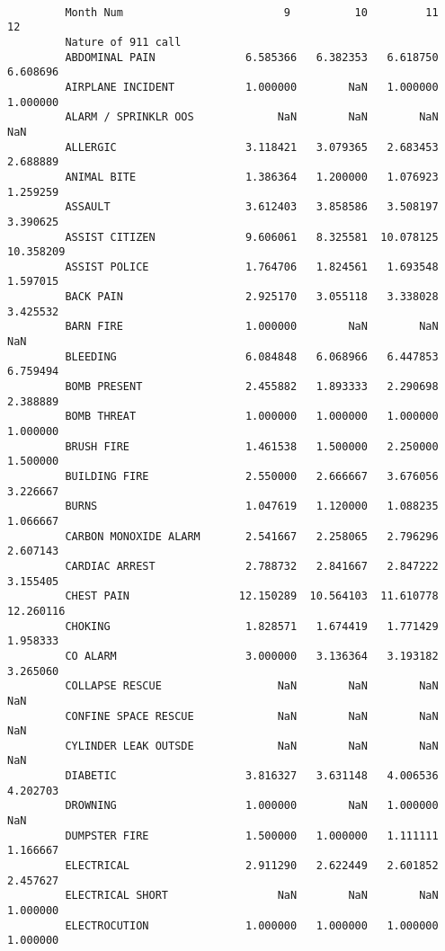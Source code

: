 \documentclass[11pt]{article}
\begin{document}
\begin{Verbatim}[commandchars=\\\{\}]
                                                                                
         Month Num                         9          10         11         12  
         Nature of 911 call                                                     
         ABDOMINAL PAIN              6.585366   6.382353   6.618750   6.608696  
         AIRPLANE INCIDENT           1.000000        NaN   1.000000   1.000000  
         ALARM / SPRINKLR OOS             NaN        NaN        NaN        NaN  
         ALLERGIC                    3.118421   3.079365   2.683453   2.688889  
         ANIMAL BITE                 1.386364   1.200000   1.076923   1.259259  
         ASSAULT                     3.612403   3.858586   3.508197   3.390625  
         ASSIST CITIZEN              9.606061   8.325581  10.078125  10.358209  
         ASSIST POLICE               1.764706   1.824561   1.693548   1.597015  
         BACK PAIN                   2.925170   3.055118   3.338028   3.425532  
         BARN FIRE                   1.000000        NaN        NaN        NaN  
         BLEEDING                    6.084848   6.068966   6.447853   6.759494  
         BOMB PRESENT                2.455882   1.893333   2.290698   2.388889  
         BOMB THREAT                 1.000000   1.000000   1.000000   1.000000  
         BRUSH FIRE                  1.461538   1.500000   2.250000   1.500000  
         BUILDING FIRE               2.550000   2.666667   3.676056   3.226667  
         BURNS                       1.047619   1.120000   1.088235   1.066667  
         CARBON MONOXIDE ALARM       2.541667   2.258065   2.796296   2.607143  
         CARDIAC ARREST              2.788732   2.841667   2.847222   3.155405  
         CHEST PAIN                 12.150289  10.564103  11.610778  12.260116  
         CHOKING                     1.828571   1.674419   1.771429   1.958333  
         CO ALARM                    3.000000   3.136364   3.193182   3.265060  
         COLLAPSE RESCUE                  NaN        NaN        NaN        NaN  
         CONFINE SPACE RESCUE             NaN        NaN        NaN        NaN  
         CYLINDER LEAK OUTSDE             NaN        NaN        NaN        NaN  
         DIABETIC                    3.816327   3.631148   4.006536   4.202703  
         DROWNING                    1.000000        NaN   1.000000        NaN  
         DUMPSTER FIRE               1.500000   1.000000   1.111111   1.166667  
         ELECTRICAL                  2.911290   2.622449   2.601852   2.457627  
         ELECTRICAL SHORT                 NaN        NaN        NaN   1.000000  
         ELECTROCUTION               1.000000   1.000000   1.000000   1.000000  

\end{Verbatim}
\end{document}

